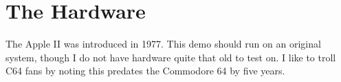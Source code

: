 \documentclass[twocolumn]{article}
\begin{document}






%

\section{The Hardware}

The Apple II was introduced in 1977.
This demo should run on an original system, though I do not
have hardware quite that old to test on.
I like to troll C64 fans by noting this predates the Commodore 64 by 
five years.
\end{document}
